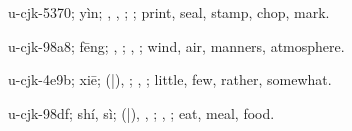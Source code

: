 \begin{multicols}{2}
{\cjkgGlue{}u-cjk-5370; yìn; \cjkgGlue{}, \cjkgGlue{}, \cjkgGlue{}\cjkgGlue{}\cjkgGlue{}; \cjkgGlue{}; print, seal, stamp, chop, mark.

\cjkgGlue{}u-cjk-98a8; fēng; \cjkgGlue{}, \cjkgGlue{}; \cjkgGlue{}, \cjkgGlue{}; wind, air, manners, atmosphere.

\cjkgGlue{}u-cjk-4e9b; xiē; \cjkgGlue{}\cjkgGlue{}(\cjkgGlue{}|\cjkgGlue{}), \cjkgGlue{}; \cjkgGlue{}, \cjkgGlue{}; little, few, rather, somewhat.

\cjkgGlue{}u-cjk-98df; shí, sì; \cjkgGlue{}\cjkgGlue{}(\cjkgGlue{}|\cjkgGlue{}), \cjkgGlue{}\cjkgGlue{}\cjkgGlue{}, \cjkgGlue{}\cjkgGlue{}\cjkgGlue{}; \cjkgGlue{}, \cjkgGlue{}; eat, meal, food.

}
\end{multicols}
